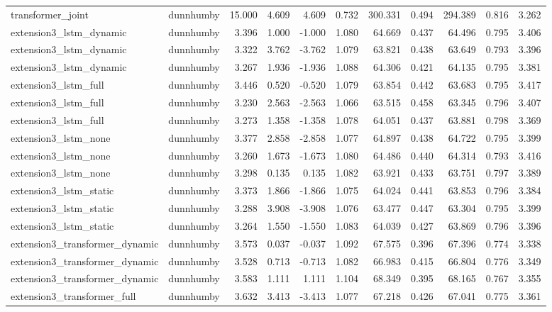 \begin{table}
\begin{tabular}{llrrrrrrrrr}
transformer_joint & dunnhumby & 15.000 & 4.609 & 4.609 & 0.732 & 300.331 & 0.494 & 294.389 & 0.816 & 3.262 \\
extension3_lstm_dynamic & dunnhumby & 3.396 & 1.000 & -1.000 & 1.080 & 64.669 & 0.437 & 64.496 & 0.795 & 3.406 \\
extension3_lstm_dynamic & dunnhumby & 3.322 & 3.762 & -3.762 & 1.079 & 63.821 & 0.438 & 63.649 & 0.793 & 3.396 \\
extension3_lstm_dynamic & dunnhumby & 3.267 & 1.936 & -1.936 & 1.088 & 64.306 & 0.421 & 64.135 & 0.795 & 3.381 \\
extension3_lstm_full & dunnhumby & 3.446 & 0.520 & -0.520 & 1.079 & 63.854 & 0.442 & 63.683 & 0.795 & 3.417 \\
extension3_lstm_full & dunnhumby & 3.230 & 2.563 & -2.563 & 1.066 & 63.515 & 0.458 & 63.345 & 0.796 & 3.407 \\
extension3_lstm_full & dunnhumby & 3.273 & 1.358 & -1.358 & 1.078 & 64.051 & 0.437 & 63.881 & 0.798 & 3.369 \\
extension3_lstm_none & dunnhumby & 3.377 & 2.858 & -2.858 & 1.077 & 64.897 & 0.438 & 64.722 & 0.795 & 3.399 \\
extension3_lstm_none & dunnhumby & 3.260 & 1.673 & -1.673 & 1.080 & 64.486 & 0.440 & 64.314 & 0.793 & 3.416 \\
extension3_lstm_none & dunnhumby & 3.298 & 0.135 & 0.135 & 1.082 & 63.921 & 0.433 & 63.751 & 0.797 & 3.389 \\
extension3_lstm_static & dunnhumby & 3.373 & 1.866 & -1.866 & 1.075 & 64.024 & 0.441 & 63.853 & 0.796 & 3.384 \\
extension3_lstm_static & dunnhumby & 3.288 & 3.908 & -3.908 & 1.076 & 63.477 & 0.447 & 63.304 & 0.795 & 3.399 \\
extension3_lstm_static & dunnhumby & 3.264 & 1.550 & -1.550 & 1.083 & 64.039 & 0.427 & 63.869 & 0.796 & 3.396 \\
extension3_transformer_dynamic & dunnhumby & 3.573 & 0.037 & -0.037 & 1.092 & 67.575 & 0.396 & 67.396 & 0.774 & 3.338 \\
extension3_transformer_dynamic & dunnhumby & 3.528 & 0.713 & -0.713 & 1.082 & 66.983 & 0.415 & 66.804 & 0.776 & 3.349 \\
extension3_transformer_dynamic & dunnhumby & 3.583 & 1.111 & 1.111 & 1.104 & 68.349 & 0.395 & 68.165 & 0.767 & 3.355 \\
extension3_transformer_full & dunnhumby & 3.632 & 3.413 & -3.413 & 1.077 & 67.218 & 0.426 & 67.041 & 0.775 & 3.361 \\

\end{tabular}
\end{table}
